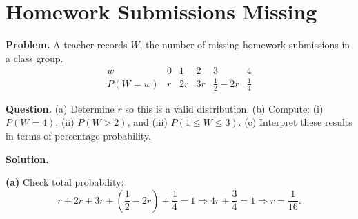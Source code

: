 		\section{Homework Submissions Missing}
		
		\textbf{Problem.}
		A teacher records $W$, the number of missing homework submissions in a class group.
		\[
		\begin{array}{c|ccccc}
			w & 0 & 1 & 2 & 3 & 4\\
			\hline
			P(W=w) & r & 2r & 3r & \frac{1}{2}-2r & \frac{1}{4}
		\end{array}
		\]
		
		\textbf{Question.}
		(a) Determine $r$ so this is a valid distribution.
		(b) Compute: (i) $P(W=4)$, (ii) $P(W>2)$, and (iii) $P(1\le W\le 3)$.
		(c) Interpret these results in terms of percentage probability.
		
		\textbf{Solution.}

		\textbf{(a)} Check total probability:
		\[
		r+2r+3r+\left(\frac{1}{2}-2r\right)+\frac{1}{4}=1
		\Rightarrow 4r+\frac{3}{4}=1
		\Rightarrow r=\frac{1}{16}.
		\]

